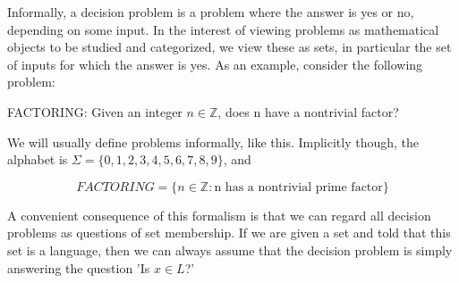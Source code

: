 Informally, a decision problem is a problem where the answer is yes or no, depending on some input. In the interest of viewing problems as mathematical objects to be studied and categorized, we view these as sets, in particular the set of inputs for which the answer is yes. As an example, consider the following problem:

\begin{problem}
FACTORING: Given an integer $n \in \mathbb{Z}$, does n have a nontrivial factor?
\end{problem}

We will usually define problems informally, like this. Implicitly though, the alphabet is $\Sigma = \{0,1,2,3,4,5,6,7,8,9\}$, and

\[FACTORING = \{n\in\mathbb{Z}: \textrm{n has a nontrivial prime factor}\} \]

A convenient consequence of this formalism is that we can regard all decision problems as questions of set membership. If we are given a set and told that this set is a language, then we can always assume that the decision problem is simply answering the question 'Is $x\in L$?'

